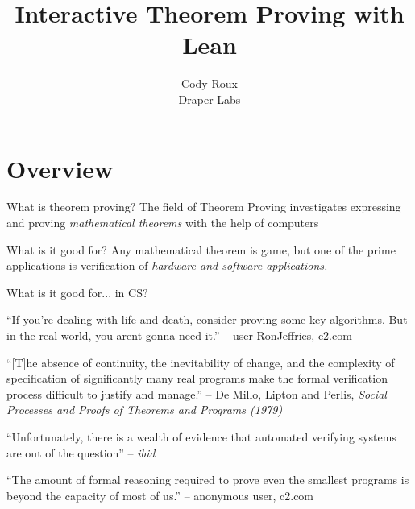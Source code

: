 \documentclass{beamer}
\title{Interactive Theorem Proving with Lean}
\author{Cody Roux\\ Draper Labs}
\begin{document}
\begin{frame}
  \maketitle
\end{frame}

\section{Overview}

\begin{frame}{What is theorem proving?}
  The field of Theorem Proving investigates expressing and proving
  \emph{mathematical theorems} with the help of computers

\end{frame}

\begin{frame}{What is it good for?}
  Any mathematical theorem is game, but one of the prime applications
  is verification of \emph{hardware and software applications.}
\end{frame}

\begin{frame}{What is it good for... in CS?}
  \begin{center}
    ``If you're dealing with life and death, consider proving some key
    algorithms. But in the real world, you arent gonna need it.'' --
    user RonJeffries, c2.com
  \end{center}
  \begin{center}
    ``[T]he absence of continuity, the inevitability of change, and
    the complexity of specification of significantly many real
    programs make the formal verification process difficult to justify
    and manage.'' -- De Millo, Lipton and Perlis, {\it Social
      Processes and Proofs of Theorems and Programs (1979)}
  \end{center}
  \begin{center}
    ``Unfortunately, there is a wealth of evidence that automated
    verifying systems are out of the question'' -- {\it ibid}
  \end{center}
  \begin{center}
    ``The amount of formal reasoning required to prove even the
    smallest programs is beyond the capacity of most of us.'' --
    anonymous user, c2.com
  \end{center}
\end{frame}
\end{document}
